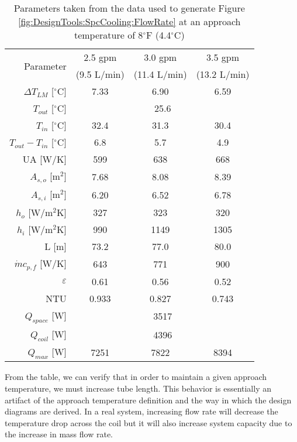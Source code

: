 	\begin{table}[h]
		\centering
		\caption[Parameters used in Figure \ref{fig:DesignTools:SpcCooling:FlowRate}]{Parameters taken from the data used to generate Figure \ref{fig:DesignTools:SpcCooling:FlowRate} at an approach temperature of 8$^\circ$F (4.4$^\circ$C)}
		\label{tab:DesignTools:SpcCooling:FlowRateParams}
		\begin{tabular}{r | c c c}
		\hline
		\multirow{2}{*}{Parameter} & 2.5 gpm & 3.0 gpm & 3.5 gpm \\
		& (9.5 L/min) & (11.4 L/min) & (13.2 L/min) \\
		\hline\hline
		$\Delta T_{LM}$ [$^\circ$C] & 7.33 & 6.90 & 6.59 \\
		\hline
		$T_{out}$ [$^\circ$C] & \multicolumn{3}{c}{25.6} \\
		\hline
		$T_{in}$ [$^\circ$C] & 32.4 & 31.3 & 30.4 \\
		\hline
		$T_{out}-T_{in}$ [$^\circ$C] & 6.8 & 5.7 & 4.9\\
		\hline
		UA [W/K] & 599 & 638 & 668 \\
		\hline
		$A_{s,o}$ [m$^2$] & 7.68 & 8.08 & 8.39 \\
		\hline
		$A_{s,i}$ [m$^2$] & 6.20 & 6.52 & 6.78 \\
		\hline
		$h_o$ [W/m$^2$K] & 327 & 323 & 320 \\
		\hline
		$h_i$ [W/m$^2$K] & 990 & 1149 & 1305 \\
		\hline
		L [m] & 73.2 & 77.0 & 80.0 \\
		\hline
		$\dot{m}c_{p,f}$ [W/K] & 643 & 771 & 900 \\
		\hline
		$\varepsilon$ & 0.61 & 0.56 & 0.52 \\
		\hline
		NTU & 0.933 & 0.827 & 0.743 \\
		\hline
		$Q_{space}$ [W] & \multicolumn{3}{c}{3517} \\
		\hline
		$Q_{coil}$ [W] & \multicolumn{3}{c}{4396} \\
		\hline
		$Q_{max}$ [W] & 7251 & 7822 & 8394 \\
		\hline
		\end{tabular}
	\end{table}
	
From the table, we can verify that in order to maintain a given approach temperature, we must increase tube length. This behavior is essentially an artifact of the approach temperature definition and the way in which the design diagrams are derived. In a real system, increasing flow rate will decrease the temperature drop across the coil but it will also increase system capacity due to the increase in mass flow rate.

